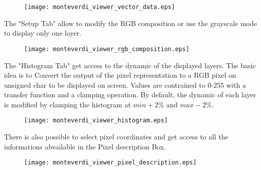 \documentclass{InsightSoftwareGuide}
\begin{document}
\begin{figure}
   \center
   \texttt{[image: monteverdi\_viewer\_vector\_data.eps]}
   \label{fig:viewervectordata}
\end{figure}

The "Setup Tab" allow to modify the RGB composition or use the grayscale mode to display only one layer. 

\begin{figure}
   \center
   \texttt{[image: monteverdi\_viewer\_rgb\_composition.eps]}
   \label{fig:rgbcomposition}
\end{figure}

The "Histogram Tab" get access to the dynamic of the displayed layers. The basic idea is to Convert the output of the 
pixel representation to a RGB pixel on unsigned char to be displayed on screen. 
Values are contrained to 0-255 with a transfer function and a clamping operation.
By default, the dynamic of each layer is modified by
clamping the histogram at $min + 2\%$ and $max - 2\%$. 

\begin{figure}
   \center
   \texttt{[image: monteverdi\_viewer\_histogram.eps]}
   \label{fig:histogram}
\end{figure}

There is also possible to select pixel coordinates and get access to all the informations abvailable in the Pixel description 
Box.

\begin{figure}
   \center
   \texttt{[image: monteverdi\_viewer\_pixel\_description.eps]}
   \label{fig:pixeldescriptioninformations}
\end{figure}
\end{document}
